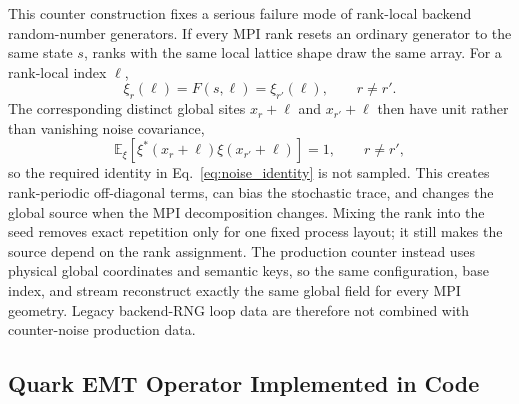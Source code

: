 \documentclass[11pt,a4paper]{article}
\begin{document}
This counter construction fixes a serious failure mode of rank-local backend
random-number generators.  If every MPI rank resets an ordinary generator to
the same state \(s\), ranks with the same local lattice shape draw the same
array.  For a rank-local index \(\ell\),
\begin{equation}
  \xi_r(\ell)=F(s,\ell)=\xi_{r'}(\ell),\qquad r\ne r'.
\end{equation}
The corresponding distinct global sites \(x_r+\ell\) and \(x_{r'}+\ell\)
then have unit rather than vanishing noise covariance,
\begin{equation}
  \mathbb E_\xi\!\left[\xi^\ast(x_r+\ell)
  \xi(x_{r'}+\ell)\right]=1,\qquad r\ne r',
\end{equation}
so the required identity in Eq.~\eqref{eq:noise_identity} is not sampled.
This creates rank-periodic off-diagonal terms, can bias the stochastic trace,
and changes the global source when the MPI decomposition changes.  Mixing the
rank into the seed removes exact repetition only for one fixed process layout;
it still makes the source depend on the rank assignment.  The production
counter instead uses physical global coordinates and semantic keys, so the
same configuration, base index, and stream reconstruct exactly the same global
field for every MPI geometry.  Legacy backend-RNG loop data are therefore not
combined with counter-noise production data.

\subsection{Quark EMT Operator Implemented in Code}
\end{document}
